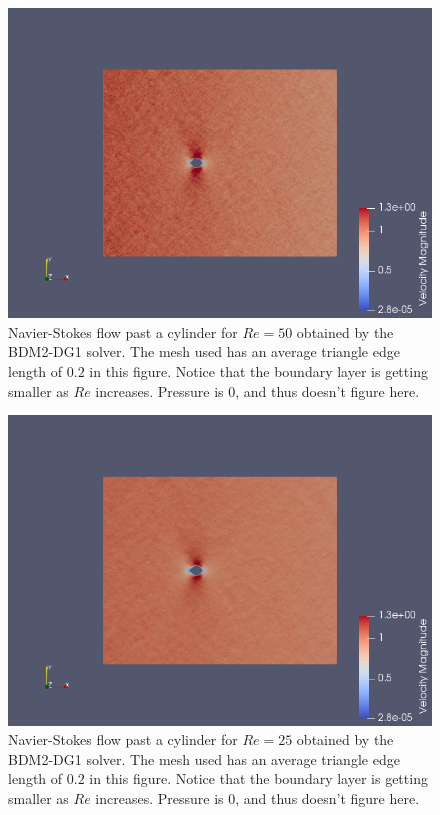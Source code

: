 \documentclass[11pt,twoside,a4paper]{article}
\begin{document}
\begin{figure}
  \includegraphics[width=\linewidth]{nscR50.png}
  \caption{Navier-Stokes flow past a cylinder for $Re = 50$ obtained by the BDM2-DG1 solver. The mesh used has an average triangle edge length of $0.2$ in this figure. Notice that the boundary layer is getting smaller as $Re$ increases. Pressure is $0$, and thus doesn't figure here.}
\end{figure}

\begin{figure}
  \includegraphics[width=\linewidth]{nscR25.png}
  \caption{Navier-Stokes flow past a cylinder for $Re = 25$ obtained by the BDM2-DG1 solver. The mesh used has an average triangle edge length of $0.2$ in this figure. Notice that the boundary layer is getting smaller as $Re$ increases. Pressure is $0$, and thus doesn't figure here.}
\end{figure}
\end{document}
